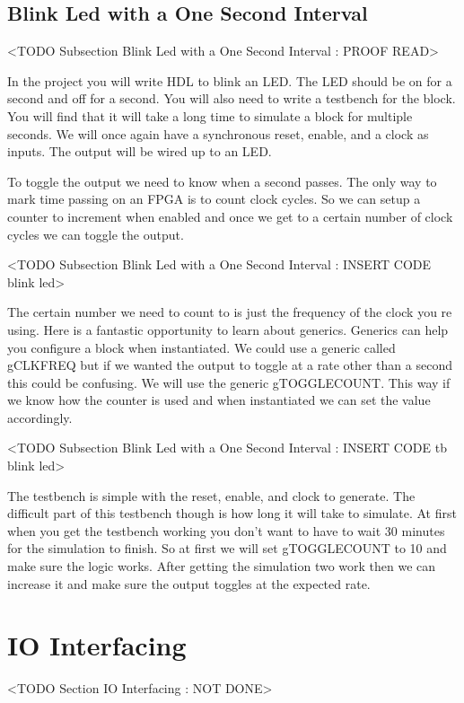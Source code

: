 	
	
\subsection{Blink Led with a One Second Interval}
	<TODO Subsection Blink Led with a One Second Interval : PROOF READ>

In the project you will write \ac{HDL} to blink an LED. The LED should be on for a second and off for a second. You will also need to write a testbench for the block. You will find that it will take a long time to simulate a block for multiple seconds. We will once again have a synchronous reset, enable, and a clock as inputs. The output will be wired up to an LED.

To toggle the output we need to know when a second passes. The only way to mark time passing on an \ac{FPGA} is to count clock cycles. So we can setup a counter to increment when enabled and once we get to a certain number of clock cycles we can toggle the output. 

    <TODO Subsection Blink Led with a One Second Interval : INSERT CODE blink led>

The certain number we need to count to is just the frequency of the clock you re using. Here is a fantastic opportunity to learn about generics. Generics can help you configure a block when instantiated. We could use a generic called gCLKFREQ but if we wanted the output to toggle at a rate other than a second this could be confusing. We will use the generic gTOGGLECOUNT. This way if we know how the counter is used and when instantiated we can set the value accordingly.

    <TODO Subsection Blink Led with a One Second Interval : INSERT CODE tb blink led>

The testbench is simple with the reset, enable, and clock to generate. The difficult part of this testbench though is how long it will take to simulate. At first when you get the testbench working you don't want to have to wait 30 minutes for the simulation to finish. So at first we will set gTOGGLECOUNT to 10 and make sure the logic works. After getting the simulation two work then we can increase it and make sure the output toggles at the expected rate. 

\section{IO Interfacing}
	<TODO Section IO Interfacing : NOT DONE>

